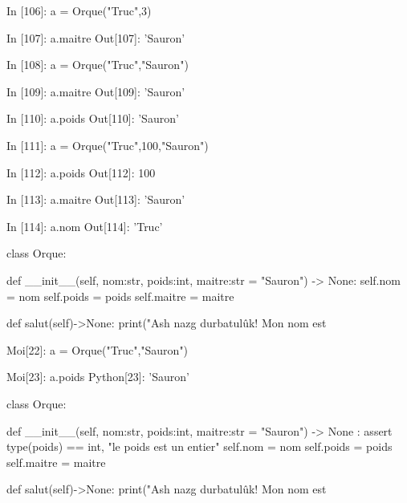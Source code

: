 \documentclass[french]{beamer}
\begin{document}
\begin{frame}[fragile]
  \begin{pythoncode}
In [106]: a = Orque("Truc",3)

In [107]: a.maitre
Out[107]: 'Sauron'

In [108]: a = Orque("Truc","Sauron")

In [109]: a.maitre
Out[109]: 'Sauron'

In [110]: a.poids
Out[110]: 'Sauron'

In [111]: a = Orque("Truc",100,"Sauron")

In [112]: a.poids
Out[112]: 100

In [113]: a.maitre
Out[113]: 'Sauron'

In [114]: a.nom
Out[114]: 'Truc'
\end{pythoncode}


  
\end{frame}




\begin{frame}[fragile]
  \begin{pythoncode}
class Orque:

    def __init__(self, nom:str, poids:int, maitre:str = "Sauron") -> None:
        self.nom    = nom
        self.poids  = poids
        self.maitre = maitre

    def salut(self)->None:
        print("Ash nazg durbatulûk! Mon nom est %
\end{pythoncode}


\end{frame}


  \begin{frame}[fragile]
    \begin{pythoncode}
Moi[22]: a = Orque("Truc","Sauron")

Moi[23]: a.poids
Python[23]: 'Sauron'
\end{pythoncode}
  \end{frame}





\begin{frame}[fragile]
  \begin{pythoncode}
class Orque:

    def __init__(self, nom:str, poids:int, maitre:str = "Sauron") -> None :
        assert type(poids) == int, "le poids est un entier"
        self.nom    = nom
        self.poids  = poids
        self.maitre = maitre

    def salut(self)->None:
        print("Ash nazg durbatulûk! Mon nom est %
\end{pythoncode}


\end{frame}
\end{document}
